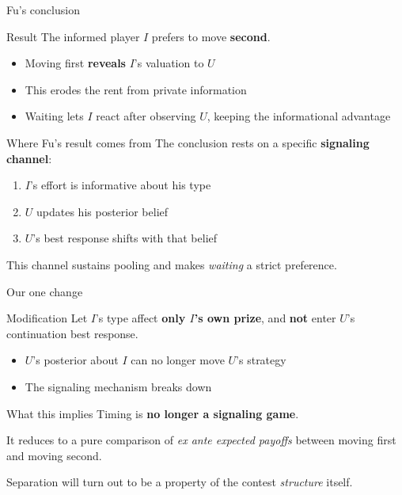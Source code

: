 \documentclass[10pt]{beamer}
\begin{document}
\begin{frame}{Fu's conclusion}
  \begin{alertblock}{Result}
    The informed player $I$ prefers to move \textbf{second}.
  \end{alertblock}

  \begin{itemize}
    \item Moving first \textbf{reveals} $I$'s valuation to $U$
    \item This erodes the rent from private information
    \item Waiting lets $I$ react after observing $U$, keeping the
          informational advantage
  \end{itemize}
\end{frame}

\begin{frame}{Where Fu's result comes from}
  The conclusion rests on a specific \textbf{signaling channel}:

  \begin{enumerate}
    \item $I$'s effort is informative about his type
    \item $U$ updates his posterior belief
    \item $U$'s best response shifts with that belief
  \end{enumerate}

  \vspace{0.5em}
  This channel sustains pooling and makes \emph{waiting} a strict
  preference.
\end{frame}

\begin{frame}{Our one change}
  \begin{alertblock}{Modification}
    Let $I$'s type affect \textbf{only $I$'s own prize}, and \textbf{not}
    enter $U$'s continuation best response.
  \end{alertblock}

  \begin{itemize}
    \item $U$'s posterior about $I$ can no longer move $U$'s strategy
    \item The signaling mechanism breaks down
  \end{itemize}
\end{frame}

\begin{frame}{What this implies}
  Timing is \textbf{no longer a signaling game}.

  \begin{block}{It reduces to}
    a pure comparison of \emph{ex ante expected payoffs} between moving
    first and moving second.
  \end{block}

  Separation will turn out to be a property of the contest
  \emph{structure} itself.
\end{frame}
\end{document}
